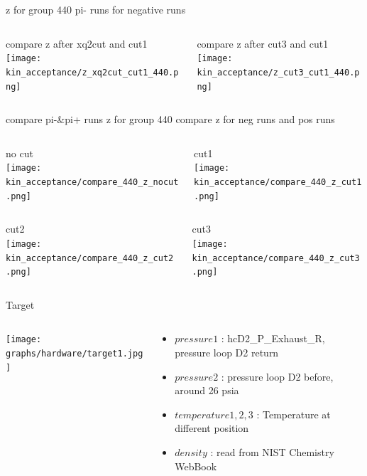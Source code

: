 \documentclass[aspectratio=169,xcolor=dvipsnames]{beamer}
\begin{document}
\begin{frame}{z for group 440 pi- runs}
  for negative runs
  \begin{columns}
    \begin{column}[T]{0.5\textwidth}
      compare z after xq2cut and cut1
      \texttt{[image: kin\_acceptance/z\_xq2cut\_cut1\_440.png]}
\end{column}
\begin{column}[T]{0.5\textwidth}
  compare z after cut3 and cut1
  \texttt{[image: kin\_acceptance/z\_cut3\_cut1\_440.png]}
\end{column}
\end{columns}
\end{frame}

\begin{frame}{compare pi-&pi+ runs z for group 440}
      compare z for neg runs and pos runs
  \begin{columns}
    \begin{column}[T]{0.5\textwidth}
      no cut\\
      \texttt{[image: kin\_acceptance/compare\_440\_z\_nocut.png]}
\end{column}
\begin{column}[T]{0.5\textwidth}
       cut1\\
  \texttt{[image: kin\_acceptance/compare\_440\_z\_cut1.png]}
\end{column}
\end{columns}
  \begin{columns}
    \begin{column}[T]{0.5\textwidth}
       cut2\\
  \texttt{[image: kin\_acceptance/compare\_440\_z\_cut2.png]}
\end{column}
\begin{column}[T]{0.5\textwidth}
       cut3\\
  \texttt{[image: kin\_acceptance/compare\_440\_z\_cut3.png]}
\end{column}
\end{columns}
\end{frame}

\begin{frame}{Target}
\begin{columns}
\begin{column}[T]{0.5\textwidth}
\texttt{[image: graphs/hardware/target1.jpg]}
\end{column}
\begin{column}[T]{0.5\textwidth}
\begin{itemize}
    \item $pressure 1$ : hcD2\_P\_Exhaust\_R, pressure loop D2 return
    \item $pressure 2$ : pressure loop D2 before, around 26 psia
    \item $temperature 1,2,3$ : Temperature at different position
    \item $density$ : read from NIST Chemistry WebBook
\end{itemize}
\end{column}
\end{columns}
\end{frame}
\end{document}
